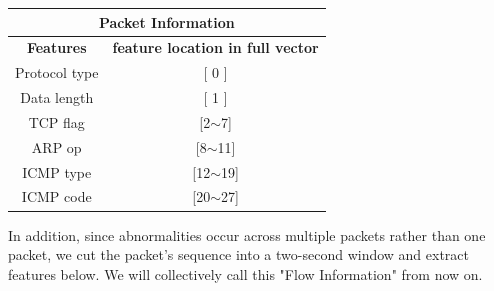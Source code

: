 \documentclass[fontsize=10pt]{article}
\begin{document}
\begin{center}
    \begin{tabular}{|c|c|}
        \multicolumn{2}{c}{\textbf{\large Packet Information}} \\ \hline
        \textbf{Features}            & \textbf{feature location in full vector}         \\ \hline
        Protocol type                & [ 0 ] \\ \hline
        Data length                  & [ 1 ]                           \\ \hline
        TCP flag                     & [2$\sim$7]                         \\ \hline
        ARP op                       & [8$\sim$11]                          \\ \hline
        ICMP type                    & [12$\sim$19]                          \\ \hline
        ICMP code                    & [20$\sim$27]                         \\ \hline
    \end{tabular}
\end{center}


In addition, since abnormalities occur across multiple packets rather than one packet, we cut the packet's sequence into a two-second window and extract features below. We will collectively call this "Flow Information" from now on.
\end{document}
